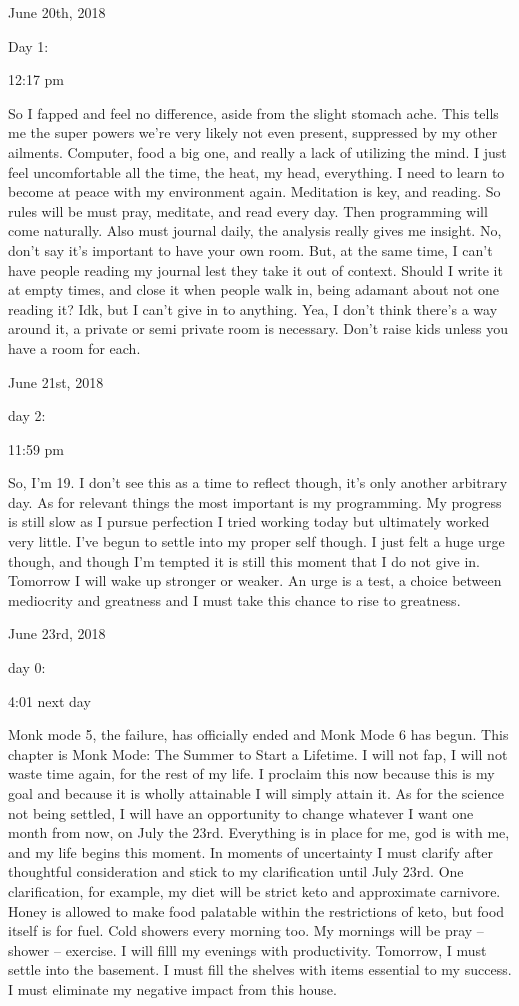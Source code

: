 \bigskip
\bigskip
June 20th, 2018

Day 1:

12:17 pm

So I fapped and feel no difference, aside from the slight stomach ache.
This tells me the super powers we're very likely not even present,
suppressed by my other ailments. Computer, food a big one, and really a
lack of utilizing the mind. I just feel uncomfortable all the time, the
heat, my head, everything. I need to learn to become at peace with my
environment again. Meditation is key, and reading. So rules will be must
pray, meditate, and read every day. Then programming will come
naturally. Also must journal daily, the analysis really gives me
insight. No, don't say it's important to have your own room. But, at the
same time, I can't have people reading my journal lest they take it out
of context. Should I write it at empty times, and close it when people
walk in, being adamant about not one reading it? Idk, but I can't give
in to anything. Yea, I don't think there's a way around it, a private or
semi private room is necessary. Don't raise kids unless you have a room
for each.

\bigskip
\bigskip
June 21st, 2018

day 2:

11:59 pm

So, I'm 19. I don't see this as a time to reflect though, it's only
another arbitrary day. As for relevant things the most important is my
programming. My progress is still slow as I pursue perfection I tried
working today but ultimately worked very little. I've begun to settle
into my proper self though. I just felt a huge urge though, and though
I'm tempted it is still this moment that I do not give in. Tomorrow I
will wake up stronger or weaker. An urge is a test, a choice between
mediocrity and greatness and I must take this chance to rise to
greatness.

\bigskip
\bigskip
June 23rd, 2018

day 0:

4:01 next day

Monk mode 5, the failure, has officially ended and Monk Mode 6 has
begun. This chapter is Monk Mode: The Summer to Start a Lifetime. I will
not fap, I will not waste time again, for the rest of my life. I
proclaim this now because this is my goal and because it is wholly
attainable I will simply attain it. As for the science not being
settled, I will have an opportunity to change whatever I want one month
from now, on July the 23rd. Everything is in place for me, god is with
me, and my life begins this moment. In moments of uncertainty I must
clarify after thoughtful consideration and stick to my clarification
until July 23rd. One clarification, for example, my diet will be strict
keto and approximate carnivore. Honey is allowed to make food palatable
within the restrictions of keto, but food itself is for fuel. Cold
showers every morning too. My mornings will be pray -- shower --
exercise. I will filll my evenings with productivity. Tomorrow, I must
settle into the basement. I must fill the shelves with items essential
to my success. I must eliminate my negative impact from this house.


